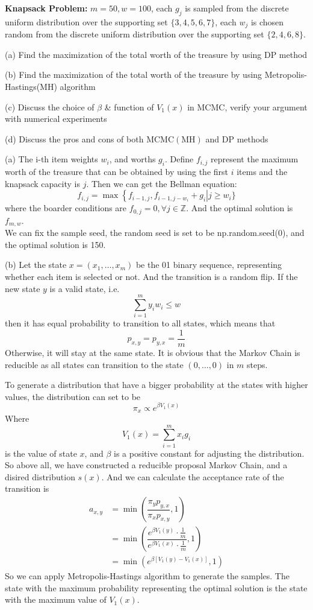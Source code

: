 \begin{homeworkProblem}

\textbf{Knapsack Problem:} $m=50, w=100$, each $g_j$ is sampled from the discrete uniform distribution over the supporting set $\{3,4,5,6,7\}$, each $w_j$ is chosen random from the discrete uniform distribution over the supporting set $\{2,4,6,8\}$.

(a) Find the maximization of the total worth of the treasure by using DP method

(b) Find the maximization of the total worth of the treasure by using Metropolis-Hastings(MH) algorithm

(c) Discuss the choice of $\beta$ \& function of $V_1(x)$ in MCMC, verify your argument with numerical experiments

(d) Discuss the pros and cons of both $\mathrm{MCMC}(\mathrm{MH})$ and DP methods

\solution

(a) The i-th item weights $w_i$, and worths $g_i$. Define $f_{i,j}$ represent the maximum worth of the treasure that can be obtained by using the first $i$ items and the knapsack capacity is $j$. Then we can get the Bellman equation:
$$f_{i,j}=\max\left\{f_{i-1,j},f_{i-1,j-w_i}+g_i\right | j\geq w_i\}$$
where the boarder conditions are $f_{0,j}=0, \forall j\in\mathbb{Z}$. And the optimal solution is $f_{m,w}$. \\
We can fix the sample seed, the random seed is set to be np.random.seed(0), and the optimal solution is 150.

(b) Let the state $x=(x_1,\ldots,x_m)$ be the 01 binary sequence, representing whether each item is selected or not. And the transition is a random flip. If the new state $y$ is a valid state, i.e.
$$\sum\limits_{i=1}^m y_iw_i\leq w$$
then it has equal probability to transition to all states, which means that
$$p_{x,y}=p_{y,x}=\dfrac{1}{m}$$
Otherwise, it will stay at the same state. It is obvious that the Markov Chain is reducible as all states can transition to the state $(0,\ldots,0)$ in $m$ steps.

To generate a distribution that have a bigger probability at the states with higher values, the distribution can set to be
$$\pi_x\propto e^{\beta V_1(x)}$$
Where
$$V_1(x) = \sum_{i=1}^m x_ig_i$$
is the value of state $x$, and $\beta$ is a positive constant for adjusting the distribution. \\
So above all, we have constructed a reducible proposal Markov Chain, and a disired distribution $s(x)$. And we can calculate the acceptance rate of the transition is
\begin{align*}
a_{x,y} &= \min\left(\dfrac{\pi_yp_{y,x}}{\pi_xp_{x,y}},1\right) \\
&= \min\left(\dfrac{e^{\beta V_1(y)}\cdot \frac{1}{m}}{e^{\beta V_1(x)}\cdot \frac{1}{m}},1\right) \\
&=\min\left(e^{\beta\left[V_1(y)-V_1(x)\right]},1\right)
\end{align*}
So we can apply Metropolis-Hastings algorithm to generate the samples. The state with the maximum probability representing the optimal solution is the state with the maximum value of $V_1(x)$.


\end{homeworkProblem}
